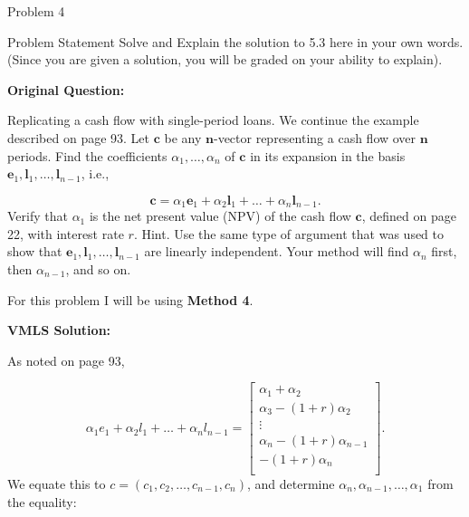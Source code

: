 \begin{problem}{Problem 4}
    \begin{statement}{Problem Statement}
        Solve and Explain the solution to 5.3 here in your own words. (Since you are given a solution, you will be graded on your ability to explain). \vspace*{1em}

        \textbf{Original Question:} \vspace*{1em}

        Replicating a cash flow with single-period loans. We continue the example described on page 93. Let $\mathbf{c}$ be any $\mathbf{n}$-vector representing a cash flow over $\mathbf{n}$ periods. Find the coefficients $\alpha_1, \ldots, \alpha_n$ of $\mathbf{c}$ in its expansion in the basis $\mathbf{e}_1, \mathbf{l}_1, \ldots, \mathbf{l}_{n-1}$, i.e.,

        \begin{equation*}
            \mathbf{c} = \alpha_1 \mathbf{e}_1 + \alpha_2 \mathbf{l}_1 + \ldots + \alpha_n \mathbf{l}_{n-1}.
        \end{equation*}
        Verify that $\alpha_1$ is the net present value (NPV) of the cash flow $\mathbf{c}$, defined on page 22, with interest rate $r$. Hint. Use the same type of argument that was used to show that $\mathbf{e}_1, \mathbf{l}_1, \ldots, \mathbf{l}_{n-1}$ are linearly independent. Your method will find $\alpha_n$ first, then $\alpha_{n-1}$, and so on.
    \end{statement}

    \begin{highlight}[Solution]
        For this problem I will be using \textbf{Method 4}. \vspace*{1em}

        \textbf{VMLS Solution:} \vspace*{1em}

        As noted on page 93,

        \begin{equation*}
            \alpha_{1}e_{1} + \alpha_{2}l_{1} + \dots + \alpha_{n}l_{n - 1} = 
            \begin{bmatrix}
                \alpha_{1} + \alpha_{2} \\
                \alpha_{3} - (1 + r)\alpha_{2} \\
                \vdots \\
                \alpha_{n} - (1 + r)\alpha_{n - 1} \\
                -(1 + r)\alpha_{n} \\
            \end{bmatrix}.
        \end{equation*}
        We equate this to $c = (c_{1}, c_{2}, \dots, c_{n-1}, c_{n})$, and determine $\alpha_{n}, \alpha_{n - 1}, \dots, \alpha_{1}$ from the equality:


\end{highlight}
\end{problem}
